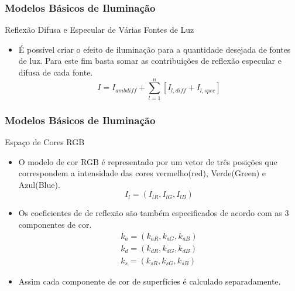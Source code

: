 \documentclass{beamer}
\begin{document}
\begin{frame}
\frametitle{Modelos Básicos de Iluminação}

	\begin{block}{Reflexão Difusa e Especular de Várias Fontes de Luz}
		\begin{itemize}
			\item É possível criar o efeito de iluminação para a quantidade desejada de fontes de luz. Para este fim basta somar as contribuições de reflexão especular e difusa de cada fonte.
			\begin{equation*}
				I = I_{ambdiff} + \sum_{l=1}^{n}[I_{l,diff} + I_{l,spec}]
			\end{equation*}
		\end{itemize}
	\end{block}
\end{frame}

\begin{frame}
\frametitle{Modelos Básicos de Iluminação}

	\begin{block}{Espaço de Cores RGB}
		\begin{itemize}
			\item O modelo de cor RGB é representado por um vetor de três posições que correspondem a intensidade das cores vermelho(red), Verde(Green) e Azul(Blue).
			\begin{equation*}
				I_l = (I_{lR},I_{lG},I_{lB}) 
			\end{equation*}
			\item Os coeficientes de de reflexão são também especificados de acordo com as 3 componentes de cor.
			\begin{eqnarray*}
				k_a = (k_{aR},k_{aG},k_{aB}) \\
				k_d = (k_{dR},k_{dG},k_{dB}) \\
				k_s = (k_{sR},k_{sG},k_{sB}) 
			\end{eqnarray*}
			\item Assim cada componente de cor de superfícies é calculado separadamente. 
		\end{itemize}
	\end{block}
\end{frame}
\end{document}
